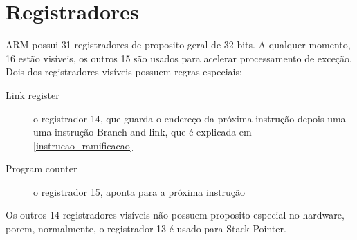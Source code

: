 \section{Registradores}

ARM possui 31 registradores de proposito geral de 32 bits. A qualquer momento, 16 estão visíveis, os outros 15 são usados para acelerar processamento de exceção. Dois dos registradores visíveis possuem regras especiais:

\begin{description}
	\item[Link register] o registrador 14, que guarda o endereço da próxima instrução depois uma uma instrução Branch and link, que é explicada em \ref{instrucao_ramificacao}
	\item[Program counter] o registrador 15, aponta para a próxima instrução
\end{description}

Os outros 14 registradores visíveis não possuem proposito especial no hardware, porem, normalmente, o registrador 13 é usado para Stack Pointer.